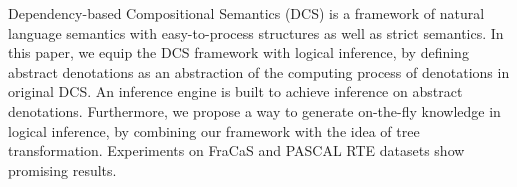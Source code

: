 Dependency-based Compositional Semantics (DCS) is a framework of natural language semantics with easy-to-process structures as well as strict semantics. In this paper, we equip the DCS framework with logical inference, by defining abstract denotations as an abstraction of the computing process of denotations in original DCS. An inference engine is built to achieve inference on abstract denotations. Furthermore, we propose a way to generate on-the-fly knowledge in logical inference, by combining our framework with the idea of tree transformation. Experiments on FraCaS and PASCAL RTE datasets show promising results.
